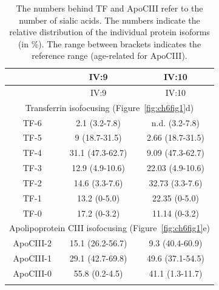 \clearpage

\footnotesize
\begin{longtable}[c]{c c c}
\caption{\textbf{Quantification of Transferrin-IEF and ApoCIII-IEF bands}} \\
      & IV:9 & IV:10 \\
     \hline
     \endfirsthead
      & IV:9 & IV:10 \\
    \hline
    \endhead
    \multicolumn{3}{c}{Transferrin isofocusing (Figure~\ref{fig:ch6fig1}d)} \\
    TF-6 & 2.1 (3.2-7.8) & n.d. (3.2-7.8) \\
    TF-5 & 9 (18.7-31.5) & 2.66 (18.7-31.5) \\
    TF-4 & 31.1 (47.3-62.7) & 9.09 (47.3-62.7) \\
    TF-3 & 12.9 (4.9-10.6) & 22.03 (4.9-10.6) \\
    TF-2 & 14.6 (3.3-7.6) & 32.73 (3.3-7.6) \\
    TF-1 & 13.2 (0-5.0) & 22.35 (0-5.0) \\
    TF-0 & 17.2 (0-3.2) & 11.14 (0-3.2) \\
    \multicolumn{3}{c}{Apolipoprotein CIII isofocusing (Figure~\ref{fig:ch6fig1}e)} \\
    ApoCIII-2 & 15.1 (26.2-56.7) & 9.3 (40.4-60.9) \\
    ApoCIII-1 & 29.1 (42.7-69.8) & 49.6 (37.1-54.5) \\
    ApoCIII-0 & 55.8 (0.2-4.5) & 41.1 (1.3-11.7) \\
    \caption*{The numbers behind TF and ApoCIII refer to the number of sialic acids. The numbers indicate the relative distribution of the individual protein isoforms (in \%). The range between brackets indicates the reference range (age-related for ApoCIII).}
    \label{tbl:ch6tbl2}
\end{longtable}

\clearpage

